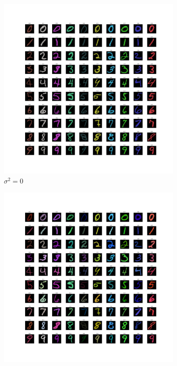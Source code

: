 \begin{figure}[H]
    \centering
    \begin{subfigure}[b]{0.48\textwidth}
        \centering
        \includegraphics[width=\textwidth]{fig/coloredemnist_0.pdf}
        \caption{$\sigma^2 = 0$}
        \label{fig:coloredeminst_0}
    \end{subfigure}
    \hfill
    \begin{subfigure}[b]{0.48\textwidth}
        \centering
        \includegraphics[width=\textwidth]{fig/coloredemnist_1000.pdf}

\end{subfigure}
\end{figure}
